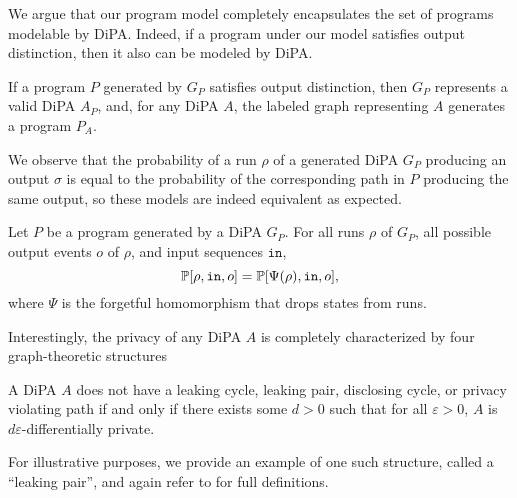 We argue that our program model completely encapsulates the set of programs modelable by DiPA. Indeed, if a program under our model satisfies output distinction, then it also can be modeled by DiPA. 

\begin{prop}
    If a program $P$ generated by $G_P$ satisfies output distinction, then $G_P$ represents a valid DiPA $A_P$, and, for any DiPA $A$, the labeled graph representing $A$ generates a program $P_A$. 
\end{prop}

We observe that the probability of a run $\rho$ of a generated DiPA $G_P$ producing an output $\sigma$ is equal to the probability of the corresponding path in $P$ producing the same output, so these models are indeed equivalent as expected.

\begin{prop}
    Let $P$ be a program generated by a DiPA $G_P$. For all runs $\rho$ of $G_P$, all possible output events $o$ of $\rho$, and input sequences $\texttt{in}$, \[
        \mathbb{P}[\rho, \texttt{in}, o]=\mathbb{P}[\Psi(\rho), \texttt{in}, o],
    \]
    where $\Psi$ is the forgetful homomorphism that drops states from runs. 
\end{prop}

Interestingly, the privacy of any DiPA $A$ is completely characterized by four graph-theoretic structures

\begin{thm}\label{DiPACounterexamplesThm}
    A DiPA $A$ does not have a leaking cycle, leaking pair, disclosing cycle, or privacy violating path if and only if there exists some $d>0$ such that for all $\varepsilon>0$, $A$ is $d\varepsilon$-differentially private. 
\end{thm}

For illustrative purposes, we provide an example of one such structure, called a ``leaking pair'', and again refer to \cite{chadhaLinearTimeDecidability2021} for full definitions.


